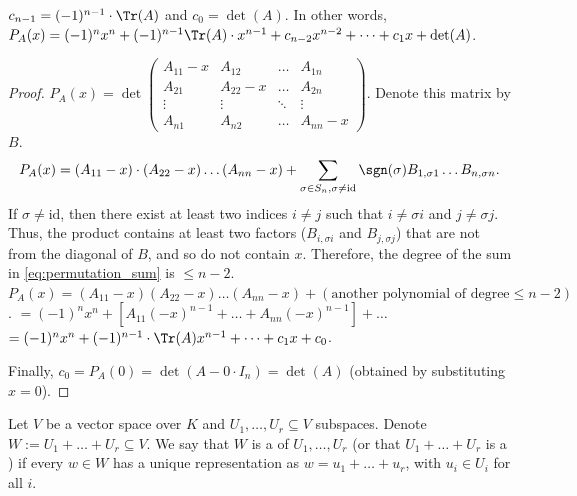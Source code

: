 \begin{lemma}\label{lem:char_poly_coeffs}
  $c_{n-1} = (-1)^{n-1} \cdot \Tr(A)$ and $c_0 = \det(A)$. In other words, $P_A(x) = (-1)^n x^n + (-1)^{n-1}\Tr(A) \cdot x^{n-1} + c_{n-2}x^{n-2} + \dots + c_1 x + \det(A)$.
\end{lemma}

\begin{proof}
  $P_A(x) = \det\begin{pmatrix} A_{11}-x & A_{12} & \dots & A_{1n} \\ A_{21} & A_{22}-x & \dots & A_{2n} \\ \vdots & \vdots & \ddots & \vdots \\ A_{n1} & A_{n2} & \dots & A_{nn}-x \end{pmatrix}$. Denote this matrix by $B$.
  \begin{equation} \label{eq:permutation_sum}
    P_A(x) = (A_{11}-x) \cdot (A_{22}-x) \dots (A_{nn}-x) + \sum_{\sigma \in S_n, \sigma \ne \mathrm{id}} \sgn(\sigma) B_{1, \sigma 1} \dots B_{n, \sigma n}.
  \end{equation}
  If $\sigma \ne \mathrm{id}$, then there exist at least two indices $i \ne j$ such that $i \ne \sigma i$ and $j \ne \sigma j$.
  Thus, the product contains at least two factors ($B_{i, \sigma i}$ and $B_{j, \sigma j}$) that are not from the diagonal of $B$, and so do not contain $x$.
  Therefore, the degree of the sum in \eqref{eq:permutation_sum} is $\le n-2$.
  $P_A(x) = (A_{11}-x)(A_{22}-x) \dots (A_{nn}-x) + (\text{another polynomial of degree} \le n-2)$.
  $= (-1)^n x^n + \left[ A_{11}(-x)^{n-1} + \dots + A_{nn}(-x)^{n-1} \right] + \dots$
  $= (-1)^n x^n + (-1)^{n-1} \cdot \Tr(A)x^{n-1} + \dots + c_1 x + c_0$.

  Finally, $c_0 = P_A(0) = \det(A - 0 \cdot I_n) = \det(A)$ (obtained by substituting $x=0$).
\end{proof}

\begin{definition}\label{def:direct_sum}
  Let $V$ be a vector space over $K$ and $U_1, \dots, U_r \subseteq V$ subspaces. Denote $W := U_1 + \dots + U_r \subseteq V$. We say that $W$ is a  of $U_1, \dots, U_r$ (or that $U_1 + \dots + U_r$ is a ) if every $w \in W$ has a unique representation as $w = u_1 + \dots + u_r$, with $u_i \in U_i$ for all $i$.
\end{definition}

